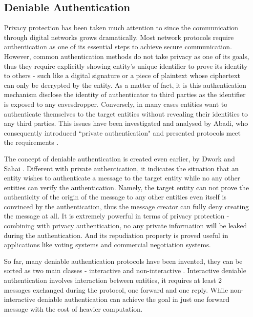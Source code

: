 \subsection{Deniable Authentication}
Privacy protection has been taken much attention to since the communication through digital networks grows dramatically. Most network protocols require authentication as one of its essential steps to achieve secure communication. However, common authentication methods do not take privacy as one of its goals, thus they require explicitly showing entity's unique identifier to prove its identity to others - such like a digital signature or a piece of plaintext whose ciphertext can only be decrypted by the entity. As a matter of fact, it is this authentication mechanism disclose the identity of authenticator to third parties as the identifier is exposed to any eavesdropper. Conversely, in many cases entities want to authenticate themselves to the target entities without revealing their identities to any third parties. This issues have been investigated and analysed by Abadi, who consequently introduced ``private authentication" and presented protocols meet the requirements \cite{Abadi}.

The concept of deniable authentication is created even earlier, by Dwork and Sahai \cite{Dwork}. Different with private authentication, it indicates the situation that an entity wishes to authenticate a message to the target entity while no any other entities can verify the authentication. Namely, the target entity can not prove the authenticity of the origin of the message to any other entities even itself is convinced by the authentication, thus the message creator can fully deny creating the message at all. It is extremely powerful in terms of privacy protection - combining with privacy authentication, no any private information will be leaked during the authentication. And its repudiation property is proved useful in applications like voting systems and commercial negotiation systems.

So far, many deniable authentication protocols have been invented, they can be sorted as two main classes - interactive \cite{Borisov} and non-interactive \cite{Shao}\cite{Wang}\cite{Xin}. Interactive deniable authentication involves interaction between entities, it requires at least 2 messages exchanged during the protocol, one forward and one reply. While non-interactive deniable authentication can achieve the goal in just one forward message with the cost of heavier computation.

